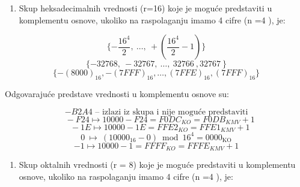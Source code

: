 \documentclass[a4paper,11pt]{article}
\numberwithin{equation}{section}
\begin{document}
\begin{enumerate}[label=\alph*),start=2,leftmargin=*]
\item Skup heksadecimalnih vrednosti (r=16) koje je moguće predstaviti u komplementu osnove, ukoliko na raspolaganju imamo 4 cifre (n =4 ), je:

\end{enumerate}


\begin{equation}\label{eq:2.5.8}
\{ - \frac{16^{4}}{2},\ \ldots,\  + \left( \frac{16^{4}}{2} - 1 \right)\}
\end{equation}
\begin{equation}\label{eq:2.5.9}
\{ - 32768,\  - 32767,\ \ldots,\ 32766\ ,32767\ \}
\end{equation}
\begin{equation}\label{eq:2.5.10}
\{-(8000)_{16},-(7FFF)_{16},\dots,(7FFE)_{16},(7FFF)_{16}\}
\end{equation}


Odgovarajuće predstave vrednosti u komplementu osnove su:



\begin{equation}\label{eq:2.5.11}
\text{\(- B2A4\) – izlazi iz skupa i nije moguće predstaviti}
\end{equation}
\begin{equation}\label{eq:2.5.12}
\ \ \ \  - F24 \longmapsto 10000 - F24 = {F0DC}_{KO} = {F0DB}_{KMV} + 1
\end{equation}
\begin{equation}\label{eq:2.5.13}
\ \ \ \  - 1E \longmapsto 10000 - 1E = {FFE2}_{KO} = {FFE1}_{KMV} + 1
\end{equation}
\begin{equation}\label{eq:2.5.14}
0\ \longmapsto\ (10000_{16}-0)\bmod16^4=0000_{\mathrm{KO}}
\end{equation}
\begin{equation}\label{eq:2.5.15}
-1 \longmapsto 10000 - 1 = {FFFF}_{KO} = {FFFE}_{KMV} + 1
\end{equation}


\begin{enumerate}[label=\alph*),start=3,leftmargin=*]
\item Skup oktalnih vrednosti (r = 8) koje je moguće predstaviti u komplementu osnove, ukoliko na raspolaganju imamo 4 cifre (n =4 ), je:

\end{enumerate}
\end{document}
